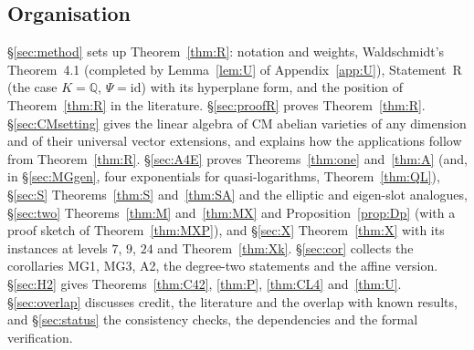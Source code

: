 \documentclass[11pt]{amsart}
\theoremstyle{definition}
\newcommand{\Q}{\mathbb{Q}}
\begin{document}
\subsection*{Organisation}
\S\ref{sec:method} sets up Theorem~\ref{thm:R}: notation and weights, Waldschmidt's Theorem~4.1 (completed by
Lemma~\ref{lem:U} of Appendix~\ref{app:U}), Statement~R (the case $K=\Q$, $\Psi=\mathrm{id}$) with its hyperplane form, and
the position of Theorem~\ref{thm:R} in the literature. \S\ref{sec:proofR} proves Theorem~\ref{thm:R}. \S\ref{sec:CMsetting}
gives the linear algebra of CM abelian varieties of any dimension and of their universal vector extensions, and explains
how the applications follow from Theorem~\ref{thm:R}. \S\ref{sec:A4E} proves Theorems~\ref{thm:one} and~\ref{thm:A} (and,
in \S\ref{sec:MGgen}, four exponentials for quasi-logarithms, Theorem~\ref{thm:QL}), \S\ref{sec:S} Theorems~\ref{thm:S}
and~\ref{thm:SA} and the elliptic and eigen-slot analogues, \S\ref{sec:two} Theorems~\ref{thm:M} and~\ref{thm:MX} and
Proposition~\ref{prop:Dp} (with a proof sketch of Theorem~\ref{thm:MXP}), and \S\ref{sec:X} Theorem~\ref{thm:X} with its
instances at levels $7$, $9$, $24$ and Theorem~\ref{thm:Xk}. \S\ref{sec:cor} collects the corollaries MG1, MG3, A2, the
degree-two statements and the affine version. \S\ref{sec:H2} gives Theorems~\ref{thm:C42}, \ref{thm:P}, \ref{thm:CL4}
and~\ref{thm:U}. \S\ref{sec:overlap} discusses credit, the literature and the overlap with known results, and
\S\ref{sec:status} the consistency checks, the dependencies and the formal verification.
\end{document}
